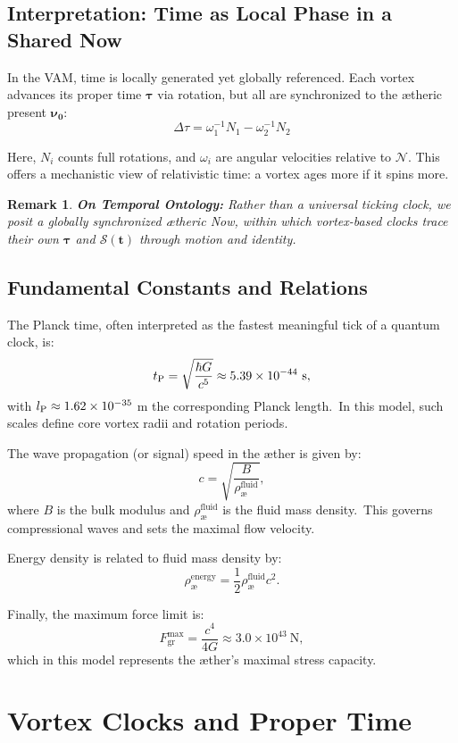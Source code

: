 \documentclass[a4paper,12pt]{article}
\newtheorem{remark}{Remark}
\begin{document}
\subsection*{Interpretation: Time as Local Phase in a Shared Now}

In the VAM, time is locally generated yet globally referenced. Each vortex advances its proper time $\boldsymbol{\tau}$ via rotation, but all are synchronized to the ætheric present $\boldsymbol{\nu_0}$:
\[
\Delta \tau = \omega_1^{-1} N_1 - \omega_2^{-1} N_2
\tag{Vortex Clock Synchronization}
\]

Here, $N_i$ counts full rotations, and $\omega_i$ are angular velocities relative to $\boldsymbol{\mathcal{N}}$. This offers a mechanistic view of relativistic time: a vortex ages more if it spins more.

\begin{remark}
\textbf{On Temporal Ontology:} Rather than a universal ticking clock, we posit a globally synchronized ætheric \emph{Now}, within which vortex-based clocks trace their own $\boldsymbol{\tau}$ and $\boldsymbol{\mathcal{S}(t)}$ through motion and identity.
\end{remark}


\subsection*{Fundamental Constants and Relations}
The Planck time, often interpreted as the fastest meaningful tick of a quantum clock, is:
\[
    t_{\textrm P} = \sqrt{\frac{\hbar G}{c^5}} \approx 5.39\times10^{-44}\ \text{s},
\]
with $l_{\textrm P} \approx 1.62\times10^{-35}$ m the corresponding Planck length.\ In this model, such scales define core vortex radii and rotation periods.

The wave propagation (or signal) speed in the æther is given by:
\[
    c = \sqrt{\frac{B}{\rho^{\text{fluid}}_{\text{\ae}}}},
\]
where $B$ is the bulk modulus and $\rho^{\text{fluid}}_{\text{\ae}}$ is the fluid mass density.\ This governs compressional waves and sets the maximal flow velocity.

Energy density is related to fluid mass density by:
\[
    \rho^{\text{energy}}_{\text{\ae}} = \frac{1}{2} \rho^{\text{fluid}}_{\text{\ae}} c^2.
\]

Finally, the maximum force limit is:
\[
    F^{\text{max}}_{\text{gr}} = \frac{c^4}{4G} \approx 3.0 \times 10^{43}\ \text{N},
\]
which in this model represents the æther’s maximal stress capacity.
\section{Vortex Clocks and Proper Time}
\end{document}
